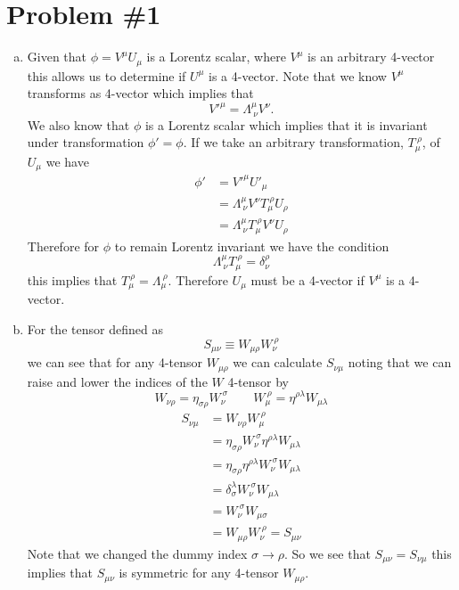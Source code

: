 \documentclass[11pt]{article}
\numberwithin{equation}{section}
\begin{document}


\section{Problem \#1}
\begin{enumerate}[(a)]
\item
    Given that $\phi = V^{\mu}U_{\mu}$ is a Lorentz scalar, where $V^{\mu}$ is an arbitrary 4-vector this allows us
    to determine if $U^{\mu}$ is a 4-vector. Note that we know $V^{\mu}$ transforms as 4-vector which implies that
    $$V'^{\mu} = \Lambda^{\mu}_{\ \nu}V^{\nu}.$$
    We also know that $\phi$ is a Lorentz scalar which implies that it is invariant under transformation 
    $\phi'=\phi$. If we take an arbitrary transformation, $T^{\ \rho}_{\mu}$, of $U_{\mu}$ we have
    \begin{align*}
        \phi' &= V'^{\mu}U'_{\mu}\\
              &= \Lambda^{\mu}_{\ \nu}V^{\nu}T^{\ \rho}_{\mu}U_{\rho}\\
              &= \Lambda^{\mu}_{\ \nu}T^{\ \rho}_{\mu}V^{\nu}U_{\rho}
    \end{align*}
    Therefore for $\phi$ to remain Lorentz invariant we have the condition
    $$\Lambda^{\mu}_{\ \nu}T^{\ \rho}_{\mu} = \delta^{\rho}_{\nu}$$
    this implies that $T^{\ \rho}_{\mu} = \Lambda^{\ \rho}_{\mu}$. Therefore $U_{\mu}$ must be a 4-vector if $V^{\mu}$
    is a 4-vector.

\item
    For the tensor defined as 
    $$S_{\mu\nu} \equiv W_{\mu\rho}W_{\nu}^{\ \rho}$$
    we can see that for any 4-tensor $W_{\mu\rho}$ we can calculate $S_{\nu\mu}$ noting that we can raise and lower
    the indices of the $W$ 4-tensor by
    $$W_{\nu\rho} = \eta_{\sigma\rho}W_{\nu}^{\ \sigma} \qquad W_{\mu}^{\ \rho} = \eta^{\rho\lambda}W_{\mu\lambda}$$
    \begin{align*}
        S_{\nu\mu} &= W_{\nu\rho}W_{\mu}^{\ \rho}\\
                   &= \eta_{\sigma\rho}W_{\nu}^{\ \sigma}\eta^{\rho\lambda}W_{\mu\lambda}\\
                   &= \eta_{\sigma\rho}\eta^{\rho\lambda}W_{\nu}^{\ \sigma}W_{\mu\lambda}\\
                   &= \delta_{\sigma}^{\lambda}W_{\nu}^{\ \sigma}W_{\mu\lambda}\\
                   &= W_{\nu}^{\ \sigma}W_{\mu\sigma}\\
                   &= W_{\mu\rho}W_{\nu}^{\ \rho} = S_{\mu\nu}
    \end{align*}
    Note that we changed the dummy index $\sigma\rightarrow\rho$. So we see that $S_{\mu\nu} = S_{\nu\mu}$ this
    implies that $S_{\mu\nu}$ is symmetric for any 4-tensor $W_{\mu\rho}$.


\end{enumerate}
\end{document}
